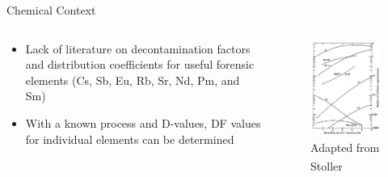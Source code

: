 \documentclass{beamer}
\newcommand{\tss}{\textsuperscript}
\begin{document}
\begin{frame}{Chemical Context}
  \begin{columns}
    \begin{column}{0.5\textwidth}
      \vspace{-10mm}
      \begin{itemize}
      \item{Lack of literature on decontamination factors and
        distribution coefficients for useful forensic elements (Cs, Sb,
        Eu, Rb, Sr, Nd, Pm, and Sm)}
      \item{With a known process and D-values, DF values for individual elements can
        be determined}
      \end{itemize}
    \end{column}
    \begin{column}{0.5\textwidth}
      \begin{figure}[H]
        \vspace*{-1cm}
        \begin{center}
	  \includegraphics[scale = 0.5]{figures/Stoller}
          \vspace{-0.5cm}
           \caption{\tiny{Adapted from Stoller\tss{\cite{stoller1961reactor}}}}
	\end{center}
      \end{figure}
    \end{column}
  \end{columns}  
\end{frame}
\end{document}

